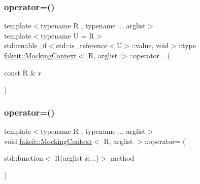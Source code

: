 \subsubsection{\texorpdfstring{operator=()}{operator=()}\hspace{0.1cm}{\footnotesize\ttfamily [24/27]}}
{\footnotesize\ttfamily template$<$typename R , typename ... arglist$>$ \\
template$<$typename U  = R$>$ \\
std\+::enable\+\_\+if$<$std\+::is\+\_\+reference$<$U$>$\+::value, void$>$\+::type \mbox{\hyperlink{classfakeit_1_1MockingContext}{fakeit\+::\+Mocking\+Context}}$<$ R, arglist $>$\+::operator= (\begin{DoxyParamCaption}\item[{const R \&}]{r }\end{DoxyParamCaption})\hspace{0.3cm}{\ttfamily [inline]}}

\mbox{\label{classfakeit_1_1MockingContext_aadefb2bd6c1dee1f3aa8902277dd3fc2}} 
\subsubsection{\texorpdfstring{operator=()}{operator=()}\hspace{0.1cm}{\footnotesize\ttfamily [25/27]}}
{\footnotesize\ttfamily template$<$typename R , typename ... arglist$>$ \\
void \mbox{\hyperlink{classfakeit_1_1MockingContext}{fakeit\+::\+Mocking\+Context}}$<$ R, arglist $>$\+::operator= (\begin{DoxyParamCaption}\item[{std\+::function$<$ R(arglist \&...)$>$}]{method }\end{DoxyParamCaption})\hspace{0.3cm}{\ttfamily [inline]}}

\mbox{\label{classfakeit_1_1MockingContext_adfac3df2408adaa86efec81bd5533a6d}} 
